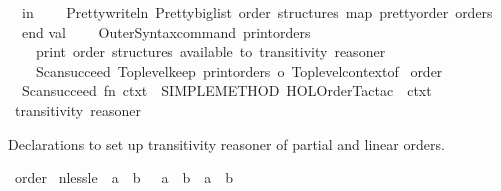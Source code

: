 \begin{isabellebody}
\ \ in\isanewline
\ \ \ \ Pretty{\isachardot}{\kern0pt}writeln\ {\isacharparenleft}{\kern0pt}Pretty{\isachardot}{\kern0pt}big{\isacharunderscore}{\kern0pt}list\ {\isachardoublequote}{\kern0pt}order\ structures{\isacharcolon}{\kern0pt}{\isachardoublequote}{\kern0pt}\ {\isacharparenleft}{\kern0pt}map\ pretty{\isacharunderscore}{\kern0pt}order\ orders{\isacharparenright}{\kern0pt}{\isacharparenright}{\kern0pt}\isanewline
\ \ end\isanewline
\isanewline
val\ {\isacharunderscore}{\kern0pt}\ {\isacharequal}{\kern0pt}\isanewline
\ \ Outer{\isacharunderscore}{\kern0pt}Syntax{\isachardot}{\kern0pt}command\ \isactrlcommandUNDERSCOREkeyword {\isasymopen}print{\isacharunderscore}{\kern0pt}orders{\isasymclose}\isanewline
\ \ \ \ {\isachardoublequote}{\kern0pt}print\ order\ structures\ available\ to\ transitivity\ reasoner{\isachardoublequote}{\kern0pt}\isanewline
\ \ \ \ {\isacharparenleft}{\kern0pt}Scan{\isachardot}{\kern0pt}succeed\ {\isacharparenleft}{\kern0pt}Toplevel{\isachardot}{\kern0pt}keep\ {\isacharparenleft}{\kern0pt}print{\isacharunderscore}{\kern0pt}orders\ o\ Toplevel{\isachardot}{\kern0pt}context{\isacharunderscore}{\kern0pt}of{\isacharparenright}{\kern0pt}{\isacharparenright}{\kern0pt}{\isacharparenright}{\kern0pt}\isanewline
\isanewline
{\isacartoucheclose}\isanewline
\isanewline
{}\isamarkupfalse%
\ order\ {\isacharequal}{\kern0pt}\ {\isacartoucheopen}\isanewline
\ \ Scan{\isachardot}{\kern0pt}succeed\ {\isacharparenleft}{\kern0pt}fn\ ctxt\ {\isacharequal}{\kern0pt}{\isachargreater}{\kern0pt}\ SIMPLE{\isacharunderscore}{\kern0pt}METHOD{\isacharprime}{\kern0pt}\ {\isacharparenleft}{\kern0pt}HOL{\isacharunderscore}{\kern0pt}Order{\isacharunderscore}{\kern0pt}Tac{\isachardot}{\kern0pt}tac\ {\isacharbrackleft}{\kern0pt}{\isacharbrackright}{\kern0pt}\ ctxt{\isacharparenright}{\kern0pt}{\isacharparenright}{\kern0pt}\isanewline
{\isacartoucheclose}\ {\isachardoublequoteopen}transitivity\ reasoner{\isachardoublequoteclose}%
\endisatagML
{\isafoldML}%
%
\isadelimML
%
\endisadelimML
%
\begin{isamarkuptext}%
Declarations to set up transitivity reasoner of partial and linear orders.%
\end{isamarkuptext}\isamarkuptrue%
\isamarkupfalse%
\ order\isanewline
{}\isanewline
\isanewline
{}\isamarkupfalse%
\ nless{\isacharunderscore}{\kern0pt}le{\isacharcolon}{\kern0pt}\ {\isachardoublequoteopen}{\isacharparenleft}{\kern0pt}{\isasymnot}\ a\ {\isacharless}{\kern0pt}\ b{\isacharparenright}{\kern0pt}\ {\isasymlongleftrightarrow}\ {\isacharparenleft}{\kern0pt}{\isasymnot}\ a\ {\isasymle}\ b{\isacharparenright}{\kern0pt}\ {\isasymor}\ a\ {\isacharequal}{\kern0pt}\ b{\isachardoublequoteclose}\isanewline

\end{isabellebody}
